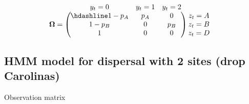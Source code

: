 \documentclass[
  12pt,
]{krantz}
\begin{document}
\[
\begin{matrix}
& \\
\mathbf{\Omega} =
    \left ( \vphantom{ \begin{matrix} 12 \\ 12 \\ 12 \end{matrix} } \right .
\end{matrix}
\hspace{-1.2em}
\begin{matrix}
    y_t=0 & y_t=1 & y_t=2 \\ \hdashline
1 - p_A & p_A & 0\\
1 - p_B & 0 & p_B\\
1 & 0 & 0
\end{matrix}
\hspace{-0.2em}
\begin{matrix}
& \\
\left . \vphantom{ \begin{matrix} 12 \\ 12 \\ 12 \end{matrix} } \right )
    \begin{matrix}
    z_{t}=A \\ z_{t}=B \\ z_{t}=D
    \end{matrix}
\end{matrix}
\]

\hypertarget{hmm-model-for-dispersal-with-2-sites-drop-carolinas-2}{%
\subsection{HMM model for dispersal with 2 sites (drop Carolinas)}\label{hmm-model-for-dispersal-with-2-sites-drop-carolinas-2}}

Observation matrix
\end{document}
